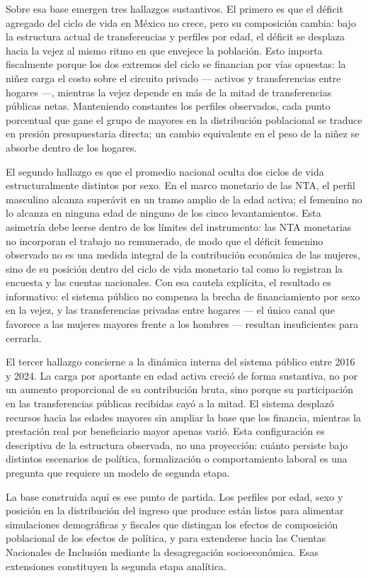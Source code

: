 \documentclass[11pt,a4paper]{article}
\begin{document}
Sobre esa base emergen tres hallazgos sustantivos. El primero es que el déficit
agregado del ciclo de vida en México no crece, pero su composición cambia: bajo la
estructura actual de transferencias y perfiles por edad, el déficit se desplaza hacia
la vejez al mismo ritmo en que envejece la población. Esto importa fiscalmente porque
los dos extremos del ciclo se financian por vías opuestas: la niñez carga el costo
sobre el circuito privado --- activos y transferencias entre hogares ---, mientras la
vejez depende en más de la mitad de transferencias públicas netas. Manteniendo
constantes los perfiles observados, cada punto porcentual que gane el grupo de mayores
en la distribución poblacional se traduce en presión presupuestaria directa; un cambio
equivalente en el peso de la niñez se absorbe dentro de los hogares.

El segundo hallazgo es que el promedio nacional oculta dos ciclos de vida
estructuralmente distintos por sexo. En el marco monetario de las NTA, el perfil
masculino alcanza superávit en un tramo amplio de la edad activa; el femenino no lo
alcanza en ninguna edad de ninguno de los cinco levantamientos. Esta asimetría debe
leerse dentro de los límites del instrumento: las NTA monetarias no incorporan el
trabajo no remunerado, de modo que el déficit femenino observado no es una medida
integral de la contribución económica de las mujeres, sino de su posición dentro del
ciclo de vida monetario tal como lo registran la encuesta y las cuentas nacionales.
Con esa cautela explícita, el resultado es informativo: el sistema público no compensa
la brecha de financiamiento por sexo en la vejez, y las transferencias privadas entre
hogares --- el único canal que favorece a las mujeres mayores frente a los hombres ---
resultan insuficientes para cerrarla.

El tercer hallazgo concierne a la dinámica interna del sistema público entre 2016 y
2024. La carga por aportante en edad activa creció de forma sustantiva, no por un
aumento proporcional de su contribución bruta, sino porque su participación en las
transferencias públicas recibidas cayó a la mitad. El sistema desplazó recursos hacia
las edades mayores sin ampliar la base que los financia, mientras la prestación real
por beneficiario mayor apenas varió. Esta configuración es descriptiva de la estructura
observada, no una proyección: cuánto persiste bajo distintos escenarios de política,
formalización o comportamiento laboral es una pregunta que requiere un modelo de
segunda etapa.

La base construida aquí es ese punto de partida. Los perfiles por edad, sexo y posición
en la distribución del ingreso que produce están listos para alimentar simulaciones
demográficas y fiscales que distingan los efectos de composición poblacional de los
efectos de política, y para extenderse hacia las Cuentas Nacionales de Inclusión
mediante la desagregación socioeconómica. Esas extensiones constituyen la segunda
etapa analítica.
\end{document}
